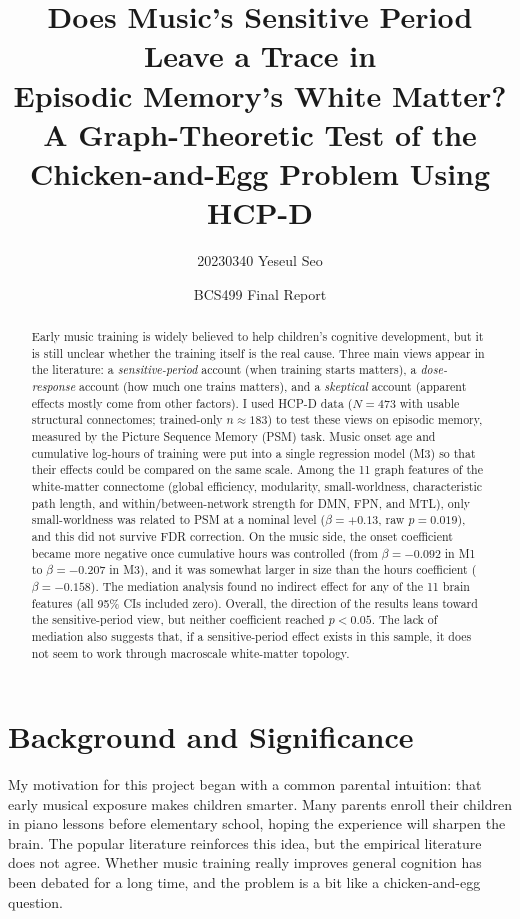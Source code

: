 \documentclass[11pt]{article}
\title{\textbf{Does Music's Sensitive Period Leave a Trace in\\
Episodic Memory's White Matter?}\\[0.3em]
\large A Graph-Theoretic Test of the Chicken-and-Egg Problem Using HCP-D}
\author[ ]{20230340 Yeseul Seo }
\affil[ ]{\texttt{github.com/ashleysys04-blip/music\_connectome\_pipeline}}
\affil[ ]{Department of Brain \& Cognitive Sciences, KAIST}
\date{BCS499 Final Report}
\begin{document}
\maketitle

\begin{abstract}
\noindent
Early music training is widely believed to help children's cognitive development, but it is still unclear whether the training itself is the real cause. Three main views appear in the literature: a \emph{sensitive-period} account (when training starts matters), a \emph{dose-response} account (how much one trains matters), and a \emph{skeptical} account (apparent effects mostly come from other factors). I used HCP-D data ($N=473$ with usable structural connectomes; trained-only $n\approx183$) to test these views on episodic memory, measured by the Picture Sequence Memory (PSM) task. Music onset age and cumulative log-hours of training were put into a single regression model (M3) so that their effects could be compared on the same scale. Among the 11 graph features of the white-matter connectome (global efficiency, modularity, small-worldness, characteristic path length, and within/between-network strength for DMN, FPN, and MTL), only small-worldness was related to PSM at a nominal level ($\beta=+0.13$, raw $p=0.019$), and this did not survive FDR correction. On the music side, the onset coefficient became more negative once cumulative hours was controlled (from $\beta=-0.092$ in M1 to $\beta=-0.207$ in M3), and it was somewhat larger in size than the hours coefficient ($\beta=-0.158$). The mediation analysis found no indirect effect for any of the 11 brain features (all 95\% CIs included zero). Overall, the direction of the results leans toward the sensitive-period view, but neither coefficient reached $p<0.05$. The lack of mediation also suggests that, if a sensitive-period effect exists in this sample, it does not seem to work through macroscale white-matter topology.
\end{abstract}

\section{Background and Significance}
My motivation for this project began with a common parental intuition: that early musical exposure makes children smarter. Many parents enroll their children in piano lessons before elementary school, hoping the experience will sharpen the brain. The popular literature reinforces this idea, but the empirical literature does not agree. Whether music training really improves general cognition has been debated for a long time, and the problem is a bit like a chicken-and-egg question.
\end{document}
